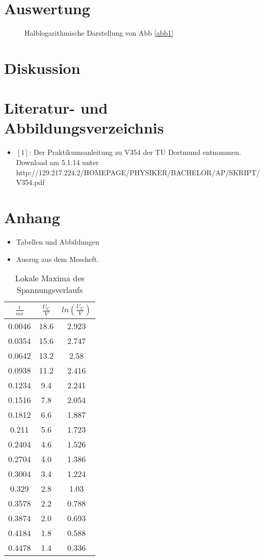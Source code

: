 \documentclass[11pt,ngerman,a4paper]{article}
\begin{document}
\section{Auswertung}

\begin{figure}[h!]
\centering
\caption{Halblogarithmische Darstellung von Abb \ref{abb1}}
\label{abb2}
\end{figure}

\section{Diskussion}

\section{Literatur- und Abbildungsverzeichnis}
\begin{itemize}
\item $[1]$: Der Praktikumsanleitung zu V354 der TU Dortmund entnommen. Download am 5.1.14 unter \newline http://129.217.224.2/HOMEPAGE/PHYSIKER/BACHELOR/AP/SKRIPT/V354.pdf
\end{itemize}
\section{Anhang}
\begin{itemize}
\item Tabellen und Abbildungen
\item Auszug aus dem Messheft.


\end{itemize}

\newpage
\begin{table}[H]
\centering
\begin{tabular}{|c|c|c|}
\hline
$\frac{t}{ms}$ & $\frac{U_C}{V}$ & $ln(\frac{U_C}{V})$ \\
\hline
0.0046 & 18.6 & 2.923\\
0.0354 & 15.6 & 2.747\\
0.0642 & 13.2 & 2.58\\
0.0938 & 11.2 & 2.416\\
0.1234 & 9.4 & 2.241\\
0.1516 & 7.8 & 2.054\\
0.1812 & 6.6 & 1.887\\
0.211 & 5.6 & 1.723\\
0.2404 & 4.6 & 1.526\\
0.2704 & 4.0 & 1.386\\
0.3004 & 3.4 & 1.224\\
0.329 & 2.8 & 1.03\\
0.3578 & 2.2 & 0.788\\
0.3874 & 2.0 & 0.693\\
0.4184 & 1.8 & 0.588\\
0.4478 & 1.4 & 0.336\\
\hline
\end{tabular}
\label{mtab1}
\caption{Lokale Maxima des Spannungsverlaufs}
\end{table}
\end{document}
